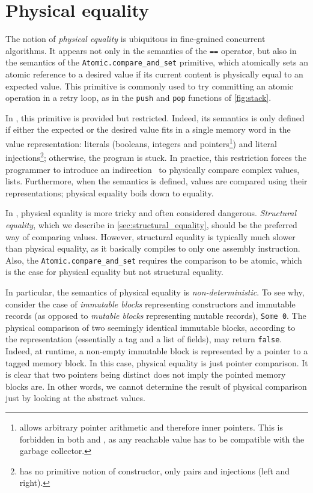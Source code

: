 \section{Physical equality}
\label{sec:physical_equality}



The notion of \emph{physical equality} is ubiquitous in fine-grained concurrent algorithms.
It appears not only in the semantics of the \texttt{==} operator, but also in the semantics of the \texttt{Atomic.compare_and_set} primitive, which atomically sets an atomic reference to a desired value if its current content is physically equal to an expected value.
This primitive is commonly used to try committing an atomic operation in a retry loop, as in the \texttt{push} and \texttt{pop} functions of \cref{fig:stack}.

In \HeapLang, this primitive is provided but restricted.
Indeed, its semantics is only defined if either the expected or the desired value fits in a single memory word in the \HeapLang value representation: literals (booleans, integers and pointers\footnote{\HeapLang allows arbitrary pointer arithmetic and therefore inner pointers. This is forbidden in both \OCaml and \ZooLang, as any reachable value has to be compatible with the garbage collector.}) and literal injections\footnote{\HeapLang has no primitive notion of constructor, only pairs and injections (left and right).}; otherwise, the program is stuck.
In practice, this restriction forces the programmer to introduce an indirection~\cite{iris/examples,DBLP:conf/cpp/VindumB21} to physically compare complex values, \eg lists.
Furthermore, when the semantics is defined, values are compared using their \Rocq representations; physical equality boils down to \Rocq equality.

In \OCaml, physical equality is more tricky and often considered dangerous.
\emph{Structural equality}, which we describe in \cref{sec:structural_equality}, should be the preferred way of comparing values.
However, structural equality is typically much slower than physical equality, as it basically compiles to only one assembly instruction.
Also, the \texttt{Atomic.compare_and_set} requires the comparison to be atomic, which is the case for physical equality but not structural equality.

In particular, the semantics of physical equality is \emph{non-deterministic}.
To see why, consider the case of \emph{immutable blocks} representing constructors and immutable records (as opposed to \emph{mutable blocks} representing mutable records), \eg \texttt{Some 0}.
The physical comparison of two seemingly identical immutable blocks, according to the \Rocq representation (essentially a tag and a list of fields), may return \texttt{false}.
Indeed, at runtime, a non-empty immutable block is represented by a pointer to a tagged memory block.
In this case, physical equality is just pointer comparison.
It is clear that two pointers being distinct does not imply the pointed memory blocks are.
In other words, we cannot determine the result of physical comparison just by looking at the abstract values.

